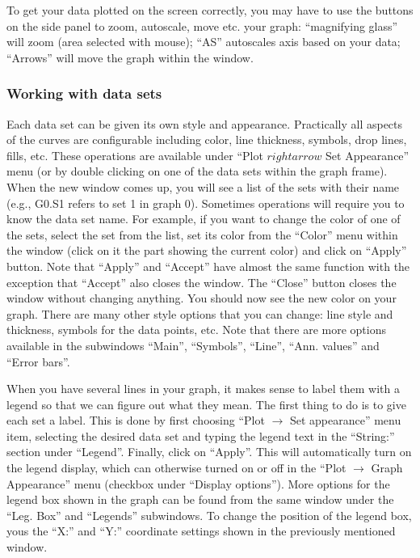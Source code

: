 \documentclass[byrevtex,amssymb,aps,pra,floatfix,letterpaper]{revtex4}
\begin{document}
To get your data plotted on the screen correctly, you may have to use the buttons on the side panel to zoom, autoscale, move etc. your graph: ``magnifying glass'' will zoom (area selected with mouse); ``AS'' autoscales axis based on your data; ``Arrows'' will move the graph within the window.

\subsubsection{Working with data sets}

Each data set can be given its own style and appearance. Practically all aspects of the curves are configurable including color, line thickness, symbols, drop lines, fills, etc. These operations are available under ``Plot $rightarrow$ Set Appearance'' menu (or by double clicking on one of the data sets within the graph frame). When the new window comes up, you will see a list of the sets with their name (e.g., G0.S1 refers to set 1 in graph 0). Sometimes operations will require you to know the data set name. For example,
if you want to change the color of one of the sets, select the set from the list, set its color from the ``Color'' menu within the window (click on it the part showing the current color) and click on ``Apply'' button. Note that ``Apply'' and ``Accept'' have almost the same function with the exception that ``Accept'' also closes the window. The ``Close'' button closes the window without changing anything. You should now see the new color on your graph. There are many other style options that you can change: line style and thickness, symbols for the data points, etc. Note that there are more options available in the subwindows ``Main'', ``Symbols'', ``Line'', ``Ann. values'' and ``Error bars''.

When you have several lines in your graph, it makes sense to label them with a legend so that we can figure out what they mean. The first thing to do is to give each set a label. This is done by first choosing ``Plot $\rightarrow$ Set appearance'' menu item, selecting the desired data set and typing the legend text in the ``String:'' section under ``Legend''. Finally, click on ``Apply''. This will automatically turn on the legend display, which can otherwise turned on or off in the ``Plot $\rightarrow$ Graph Appearance'' menu (checkbox under ``Display options''). More options for the legend box shown in the graph can be found from the same window under the ``Leg. Box'' and ``Legends'' subwindows. To change the position of the legend box, yous the ``X:'' and ``Y:'' coordinate settings shown in the previously mentioned window.
\end{document}
